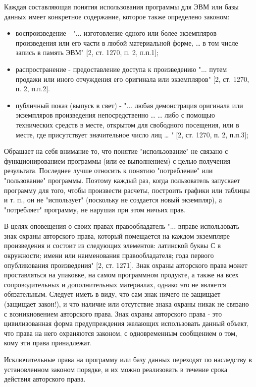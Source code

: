     Каждая составляющая понятия использования программы для ЭВМ или базы данных имеет конкретное содержание, которое также определено законом:
    \begin{itemize}
        \item   воспроизведение - "... изготовление одного или более экземпляров произведения или его части в любой материальной форме, … в том числе запись в память ЭВМ" [2, ст. 1270, п. 2, п.п.1];
        \item распространение - предоставление доступа к произведению "... путем продажи или иного отчуждения его оригинала или экземпляров" [2, ст. 1270, п. 2, п.п.2].
        \item публичный показ (выпуск в свет) - "... любая демонстрация оригинала или экземпляров произведения непосредственно … … либо с помощью технических средств в месте, открытом для свободного посещения, или в месте, где присутствует значительное число лиц … " [2, ст. 1270, п. 2, п.п.3];
    \end{itemize}

    Обращает на себя внимание то, что понятие "использование" не связано с функционированием программы (или ее выполнением) с целью получения результата. Последнее лучше относить к понятию "потребление" или "пользование" программы. Поэтому каждый раз, когда пользователь запускает программу для того, чтобы произвести расчеты, построить графики или таблицы и т. п., он не "использует" (поскольку не создается новый экземпляр), а "потребляет" программу, не нарушая при этом ничьих прав.

    В целях оповещения о своих правах правообладатель "... вправе использовать знак охраны авторского права, который помещается на каждом экземпляре произведения и состоит из следующих элементов: латинской буквы С в окружности; имени или наименования правообладателя; года первого опубликования произведения" [2, ст. 1271]. Знак охраны авторского права может проставляться на упаковке, на самом программном продукте, а также на всех сопроводительных и дополнительных материалах, однако это не является обязательным. Следует иметь в виду, что сам знак ничего не защищает (защищает закон!), и что наличие или отсутствие знака охраны никак не связано с возникновением авторского права. Знак охраны авторского права - это цивилизованная форма предупреждения желающих использовать данный объект, что права на него охраняются законом, с одновременным сообщением о том, кому эти права принадлежат.

    Исключительные права на программу или базу данных переходят по наследству в установленном законом порядке, и их можно реализовать в течение срока действия авторского права.


